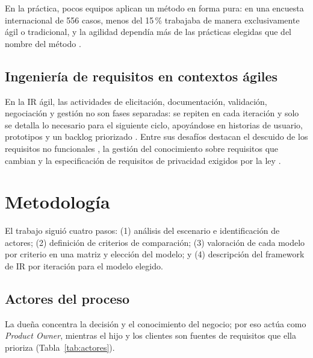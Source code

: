\documentclass[11pt,a4paper]{article}
\begin{document}
En la práctica, pocos equipos aplican un método en forma pura: en una
encuesta internacional de 556 casos, menos del 15\,\% trabajaba de manera
exclusivamente ágil o tradicional, y la agilidad dependía más de las
prácticas elegidas que del nombre del método \cite{kuhrmann2022}.

\subsection{Ingeniería de requisitos en contextos ágiles}

En la IR ágil, las actividades de elicitación, documentación, validación,
negociación y gestión no son fases separadas: se repiten en cada iteración
y solo se detalla lo necesario para el siguiente ciclo, apoyándose en
historias de usuario, prototipos y un backlog priorizado \cite{schon2017}.
Entre sus desafíos destacan el descuido de los requisitos no funcionales
\cite{schon2017}, la gestión del conocimiento sobre requisitos que cambian
\cite{kasauli2021} y la especificación de requisitos de privacidad exigidos
por la ley \cite{canedo2022}.

\section{Metodología}

El trabajo siguió cuatro pasos: (1) análisis del escenario e identificación
de actores; (2) definición de criterios de comparación; (3) valoración de
cada modelo por criterio en una matriz y elección del modelo; y
(4) descripción del framework de IR por iteración para el modelo elegido.

\subsection{Actores del proceso}

La dueña concentra la decisión y el conocimiento del negocio; por eso actúa
como \emph{Product Owner}, mientras el hijo y los clientes son fuentes de
requisitos que ella prioriza (Tabla~\ref{tab:actores}).
\end{document}
